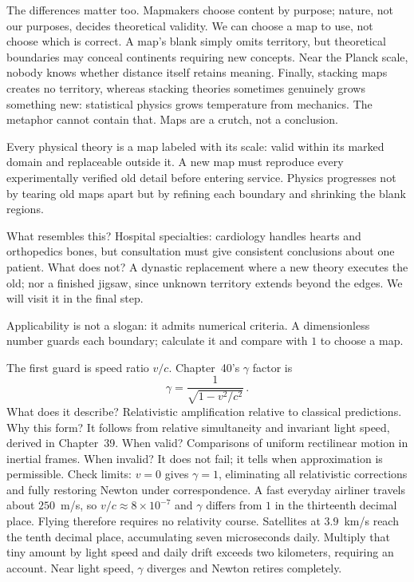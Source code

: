 The differences matter too. Mapmakers choose content by purpose; nature, not our purposes, decides theoretical validity. We can choose a map to use, not choose which is correct. A map's blank simply omits territory, but theoretical boundaries may conceal continents requiring new concepts. Near the Planck scale, nobody knows whether distance itself retains meaning. Finally, stacking maps creates no territory, whereas stacking theories sometimes genuinely grows something new: statistical physics grows temperature from mechanics. The metaphor cannot contain that. Maps are a crutch, not a conclusion.


\begin{oneline}
Every physical theory is a map labeled with its scale: valid within its marked domain and replaceable outside it. A new map must reproduce every experimentally verified old detail before entering service. Physics progresses not by tearing old maps apart but by refining each boundary and shrinking the blank regions.
\end{oneline}

What resembles this? Hospital specialties: cardiology handles hearts and orthopedics bones, but consultation must give consistent conclusions about one patient. What does not? A dynastic replacement where a new theory executes the old; nor a finished jigsaw, since unknown territory extends beyond the edges. We will visit it in the final step.


Applicability is not a slogan: it admits numerical criteria. A dimensionless number guards each boundary; calculate it and compare with $1$ to choose a map.

The first guard is speed ratio $v/c$. Chapter~40's $\gamma$ factor is
\[
\gamma=\frac{1}{\sqrt{1-v^{2}/c^{2}}}\, .
\]
What does it describe? Relativistic amplification relative to classical predictions. Why this form? It follows from relative simultaneity and invariant light speed, derived in Chapter~39. When valid? Comparisons of uniform rectilinear motion in inertial frames. When invalid? It does not fail; it tells when approximation is permissible. Check limits: $v=0$ gives $\gamma=1$, eliminating all relativistic corrections and fully restoring Newton under correspondence. A fast everyday airliner travels about $250$~m/s, so $v/c\approx8\times10^{-7}$ and $\gamma$ differs from $1$ in the thirteenth decimal place. Flying therefore requires no relativity course. Satellites at $3.9$~km/s reach the tenth decimal place, accumulating seven microseconds daily. Multiply that tiny amount by light speed and daily drift exceeds two kilometers, requiring an account. Near light speed, $\gamma$ diverges and Newton retires completely.

